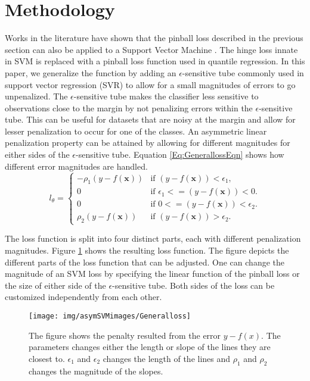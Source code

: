 \documentclass[twoside,11pt]{article}
\begin{document}
\section{Methodology}\label{generalform}
Works in the literature have shown that the pinball loss described in the previous section can also be applied to a Support Vector Machine \citep{Quadrianto09}. The hinge loss innate in SVM is replaced with a pinball loss function used in quantile regression. In this paper, we generalize the function by adding an $\epsilon$-sensitive tube commonly used in support vector regression (SVR) to allow for a small magnitudes of errors to go unpenalized. The $\epsilon$-sensitive tube makes the classifier less sensitive to observations close to the margin by not penalizing errors within the $\epsilon$-sensitive tube. This can be useful for datasets that are noisy at the margin and allow for lesser penalization to occur for one of the classes. An asymmetric linear penalization property can be attained by allowing for different magnitudes for either sides of the $\epsilon$-sensitive tube. Equation \ref{Eq:GenerallossEqn} shows how different error magnitudes are handled.
\begin{equation}\label{Eq:GenerallossEqn}
l_{\theta}=\begin{cases} 
	-\rho_1(y-f(\mathbf{x})) & \text{if $(y-f(\mathbf{x}))< \epsilon_1$,} \\
 0  &\text{if $\epsilon_1<=(y-f(\mathbf{x}))< 0$.} \\
 0  &\text{if $0<=(y-f(\mathbf{x}))< \epsilon_2$.} \\
 \rho_2(y-f(\mathbf{x})) &\text{if $(y-f(\mathbf{x}))>\epsilon_2$.}
\end{cases}
\end{equation}

The loss function is split into four distinct parts, each with different penalization magnitudes. Figure \ref{Fig:General Loss} shows the resulting loss function. The figure depicts the different parts of the loss function that can be adjusted. One can change the magnitude of an SVM loss by specifying the linear function of the pinball loss or the size of either side of the $\epsilon$-sensitive tube. Both sides of the loss can be customized independently from each other.
\begin{figure}
 \centering
\texttt{[image: img/asymSVMimages/Generalloss]}\\
 \caption{The figure shows the penalty resulted from the error $y-f(x)$. The parameters changes either the length or slope of the lines they are closest to. $\epsilon_1$ and $\epsilon_2$ changes the length of the lines and $\rho_1$ and $\rho_2$ changes the magnitude of the slopes.}
 \label{Fig:General Loss}
\end{figure}
\end{document}
